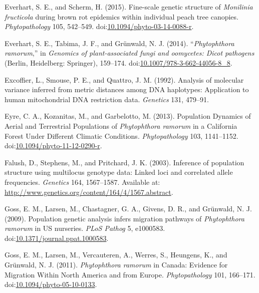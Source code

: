 \documentclass[double,12pt]{beavtex}
\begin{document}
  \hypertarget{ref-everhart2014fine}{}
  Everhart, S. E., and Scherm, H. (2015). Fine-scale genetic structure of
  \emph{Monilinia fructicola} during brown rot epidemics within individual
  peach tree canopies. \emph{Phytopathology} 105, 542--549.
  doi:\href{https://doi.org/10.1094/phyto-03-14-0088-r}{10.1094/phyto-03-14-0088-r}.
  
  \hypertarget{ref-everhart2014phytophthora}{}
  Everhart, S. E., Tabima, J. F., and Grünwald, N. J. (2014).
  ``\emph{Phytophthora ramorum},'' in \emph{Genomics of plant-associated
  fungi and oomycetes: Dicot pathogens} (Berlin, Heidelberg: Springer),
  159--174.
  doi:\href{https://doi.org/10.1007/978-3-662-44056-8_8}{10.1007/978-3-662-44056-8\_8}.
  
  \hypertarget{ref-excoffier1992analysis}{}
  Excoffier, L., Smouse, P. E., and Quattro, J. M. (1992). Analysis of
  molecular variance inferred from metric distances among DNA haplotypes:
  Application to human mitochondrial DNA restriction data. \emph{Genetics}
  131, 479--91.
  
  \hypertarget{ref-eyre2013poulation}{}
  Eyre, C. A., Kozanitas, M., and Garbelotto, M. (2013). Population
  Dynamics of Aerial and Terrestrial Populations of \emph{Phytophthora
  ramorum} in a California Forest Under Different Climatic Conditions.
  \emph{Phytopathology} 103, 1141--1152.
  doi:\href{https://doi.org/10.1094/phyto-11-12-0290-r}{10.1094/phyto-11-12-0290-r}.
  
  \hypertarget{ref-Falush01082003}{}
  Falush, D., Stephens, M., and Pritchard, J. K. (2003). Inference of
  population structure using multilocus genotype data: Linked loci and
  correlated allele frequencies. \emph{Genetics} 164, 1567--1587.
  Available at: \url{http://www.genetics.org/content/164/4/1567.abstract}.
  
  \hypertarget{ref-goss2009population}{}
  Goss, E. M., Larsen, M., Chastagner, G. A., Givens, D. R., and Grünwald,
  N. J. (2009). Population genetic analysis infers migration pathways of
  \emph{Phytophthora ramorum} in US nurseries. \emph{PLoS Pathog} 5,
  e1000583.
  doi:\href{https://doi.org/10.1371/journal.ppat.1000583}{10.1371/journal.ppat.1000583}.
  
  \hypertarget{ref-goss2011phytophthora}{}
  Goss, E. M., Larsen, M., Vercauteren, A., Werres, S., Heungens, K., and
  Grünwald, N. J. (2011). \emph{Phytophthora ramorum} in Canada: Evidence
  for Migration Within North America and from Europe.
  \emph{Phytopathology} 101, 166--171.
  doi:\href{https://doi.org/10.1094/phyto-05-10-0133}{10.1094/phyto-05-10-0133}.
  
\end{document}
